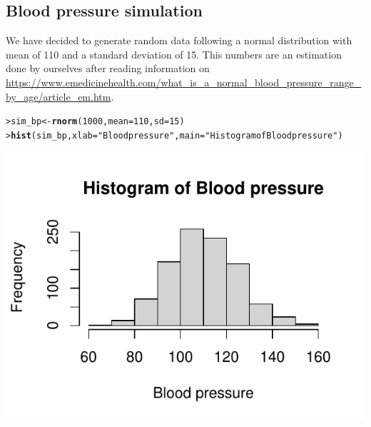 \documentclass{article}\usepackage[]{graphicx}\usepackage[]{xcolor}
\makeatletter
\def\maxwidth{ %
  \ifdim\Gin@nat@width>\linewidth
    \linewidth
  \else
    \Gin@nat@width
  \fi
}
\newcommand{\hlnum}[1]{\textcolor[rgb]{0.686,0.059,0.569}{#1}}%
\newcommand{\hlstr}[1]{\textcolor[rgb]{0.192,0.494,0.8}{#1}}%
\newcommand{\hlstd}[1]{\textcolor[rgb]{0.345,0.345,0.345}{#1}}%
\newcommand{\hlkwb}[1]{\textcolor[rgb]{0.69,0.353,0.396}{#1}}%
\newcommand{\hlkwc}[1]{\textcolor[rgb]{0.333,0.667,0.333}{#1}}%
\newcommand{\hlkwd}[1]{\textcolor[rgb]{0.737,0.353,0.396}{\textbf{#1}}}%
\newenvironment{kframe}{%
 \def\at@end@of@kframe{}%
 \ifinner\ifhmode%
  \def\at@end@of@kframe{\end{minipage}}%
  \begin{minipage}{\columnwidth}%
 \fi\fi%
 \def\FrameCommand##1{\hskip\@totalleftmargin \hskip-\fboxsep
 \colorbox{shadecolor}{##1}\hskip-\fboxsep
     \hskip-\linewidth \hskip-\@totalleftmargin \hskip\columnwidth}%
 \MakeFramed {\advance\hsize-\width
   \@totalleftmargin\z@ \linewidth\hsize
   \@setminipage}}%
 {\par\unskip\endMakeFramed%
 \at@end@of@kframe}
\newenvironment{knitrout}{}{} %
\makeatother
\begin{document}
\subsection*{Blood pressure simulation}
We have decided to generate random data following a normal distribution with mean of 110 and a standard deviation of 15. This numbers are an estimation done by ourselves after reading information on \url{https://www.emedicinehealth.com/what_is_a_normal_blood_pressure_range_by_age/article_em.htm}.
\begin{knitrout}\footnotesize
{}\color{fgcolor}\begin{kframe}
\begin{alltt}
\hlstd{> }\hlstd{sim_bp} \hlkwb{<-} \hlkwd{rnorm}\hlstd{(}\hlnum{1000}\hlstd{,} \hlkwc{mean} \hlstd{=} \hlnum{110}\hlstd{,} \hlkwc{sd} \hlstd{=} \hlnum{15}\hlstd{)}
\hlstd{> }\hlkwd{hist}\hlstd{(sim_bp,} \hlkwc{xlab} \hlstd{=} \hlstr{"Blood pressure"}\hlstd{,} \hlkwc{main} \hlstd{=} \hlstr{"Histogram of Blood pressure"}\hlstd{)}
\end{alltt}
\end{kframe}

{\centering \includegraphics[width=\maxwidth]{figure/sim_bp-1} 

}


\end{knitrout}
\end{document}
